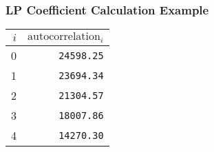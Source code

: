 \begin{landscape}

\subsubsection{LP Coefficient Calculation Example}
\begin{table}[h]
{
\begin{tabular}{r|r}
$i$ & $\text{autocorrelation}_i$ \\
\hline
0 & \texttt{24598.25} \\
1 & \texttt{23694.34} \\
2 & \texttt{21304.57} \\
3 & \texttt{18007.86} \\
4 & \texttt{14270.30} \\
\end{tabular}
}
\end{table}


\end{landscape}
